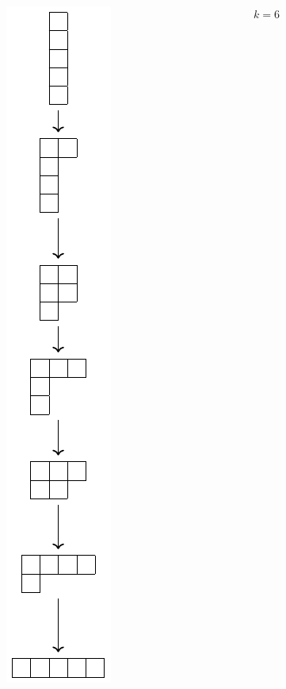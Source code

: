 \documentclass[
    9pt,
    hyperref={bookmarks=false, colorlinks=false}, %
    xcolor={dvipsnames},
]{beamer}
\begin{document}
\begin{frame}
\begin{columns}
\begin{column}{0.25\textwidth}
\begin{center}
                \includegraphics[scale=0.4]{figures/majorization_k_5.pdf}
            \end{center}
        \end{column}
        \begin{column}{0.25\textwidth}
            \begin{center}
                $k=6$ \\

\end{center}
\end{column}
\end{columns}
\end{frame}
\end{document}
